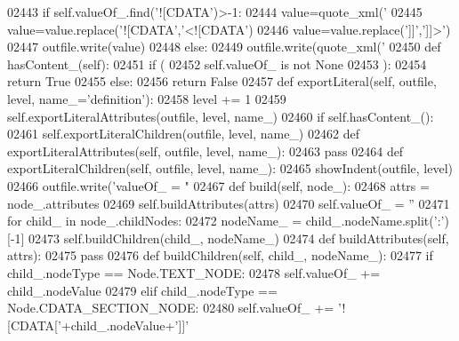 \begin{DoxyCode}
{{{{{{{{{{{{{{{{{{{{{{{{{{{{{{{{{{{{{{{{{{{{{{{{{{{{{{{{{{{{{{{{{{{{{{{{{{{{{{{{{{{{{{{{{{{{{{{{{{{{{{{{{{{{{{{{{{{{{{{{{{{{{{{{{{{{{{{{{{{{{{{{{{{{{{{{{{{{{{{{{{{{{{{{{{{{02443         \textcolor{keywordflow}{if} self.valueOf\_.find(\textcolor{stringliteral}{'![CDATA'})>-1:
02444             value=quote_xml(\textcolor{stringliteral}{'%
02445             value=value.replace(\textcolor{stringliteral}{'![CDATA'},\textcolor{stringliteral}{'<![CDATA'})
02446             value=value.replace(\textcolor{stringliteral}{']]'},\textcolor{stringliteral}{']]>'})
02447             outfile.write(value)
02448         \textcolor{keywordflow}{else}:
02449             outfile.write(quote_xml(\textcolor{stringliteral}{'%
02450     \textcolor{keyword}{def }hasContent_(self):
02451         \textcolor{keywordflow}{if} (
02452             self.valueOf_ \textcolor{keywordflow}{is} \textcolor{keywordflow}{not} \textcolor{keywordtype}{None}
02453             ):
02454             \textcolor{keywordflow}{return} \textcolor{keyword}{True}
02455         \textcolor{keywordflow}{else}:
02456             \textcolor{keywordflow}{return} \textcolor{keyword}{False}
02457     \textcolor{keyword}{def }exportLiteral(self, outfile, level, name\_='definition'):
02458         level += 1
02459         self.exportLiteralAttributes(outfile, level, name\_)
02460         \textcolor{keywordflow}{if} self.hasContent_():
02461             self.exportLiteralChildren(outfile, level, name\_)
02462     \textcolor{keyword}{def }exportLiteralAttributes(self, outfile, level, name\_):
02463         \textcolor{keywordflow}{pass}
02464     \textcolor{keyword}{def }exportLiteralChildren(self, outfile, level, name\_):
02465         showIndent(outfile, level)
02466         outfile.write(\textcolor{stringliteral}{'valueOf\_ = "%
02467     \textcolor{keyword}{def }build(self, node\_):
02468         attrs = node\_.attributes
02469         self.buildAttributes(attrs)
02470         self.valueOf_ = \textcolor{stringliteral}{''}
02471         \textcolor{keywordflow}{for} child\_ \textcolor{keywordflow}{in} node\_.childNodes:
02472             nodeName\_ = child\_.nodeName.split(\textcolor{stringliteral}{':'})[-1]
02473             self.buildChildren(child\_, nodeName\_)
02474     \textcolor{keyword}{def }buildAttributes(self, attrs):
02475         \textcolor{keywordflow}{pass}
02476     \textcolor{keyword}{def }buildChildren(self, child\_, nodeName\_):
02477         \textcolor{keywordflow}{if} child\_.nodeType == Node.TEXT\_NODE:
02478             self.valueOf\_ += child\_.nodeValue
02479         \textcolor{keywordflow}{elif} child\_.nodeType == Node.CDATA\_SECTION\_NODE:
02480             self.valueOf\_ += \textcolor{stringliteral}{'![CDATA['}+child\_.nodeValue+\textcolor{stringliteral}{']]'}
}}}}}}}}}}}}}}}}}}}}}}}}}}}}}}}}}}}}}}}}}}}}}}}}}}}}}}}}}}}}}}}}}}}}}}}}}}}}}}}}}}}}}}}}}}}}}}}}}}}}}}}}}}}}}}}}}}}}}}}}}}}}}}}}}}}}}}}}}}}}}}}}}}}}}}}}}}}}}}}}}}}}}}}}}}}}}}}
\end{DoxyCode}
